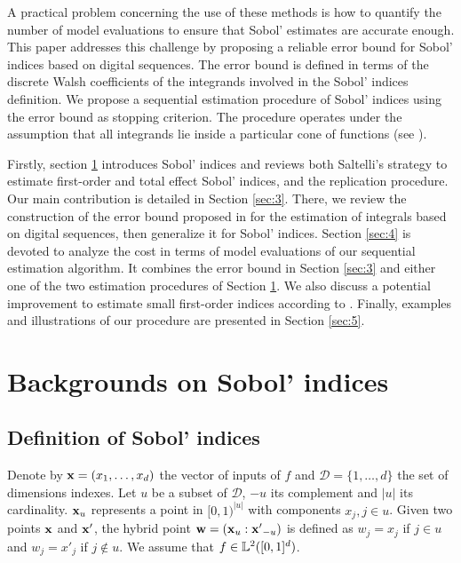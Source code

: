 A practical problem concerning the use of these methods is how to quantify the number of model evaluations to ensure that Sobol' estimates are accurate enough. This paper addresses this challenge by proposing a reliable error bound for Sobol' indices based on digital sequences. The error bound is defined in terms of the discrete Walsh coefficients of the integrands involved in the Sobol' indices definition. We propose a sequential estimation procedure of Sobol' indices using the error bound as stopping criterion. The procedure operates under the assumption that all integrands lie inside a particular cone of functions (see \cite{HicJim}).

Firstly, section \ref{sec:2} introduces Sobol' indices and reviews both Saltelli's strategy to estimate first-order and total effect Sobol' indices, and the replication procedure. Our main contribution is detailed in  Section \ref{sec:3}. There, we review the construction of the error bound proposed in \cite{HicJim} for the estimation of integrals based on digital sequences, then generalize it for Sobol' indices. Section \ref{sec:4} is devoted to analyze the cost in terms of model evaluations of our sequential estimation algorithm. It combines the error bound in Section \ref{sec:3} and either one of the two estimation procedures of Section \ref{sec:2}. We also discuss a potential improvement to estimate small first-order indices according to \cite{Owen}. Finally, examples and illustrations of our procedure are presented in Section \ref{sec:5}. 

\section{Backgrounds on Sobol' indices}
\label{sec:2}

\subsection{Definition of Sobol' indices}
\label{sec:2.1}
Denote by $\boldsymbol{\mathbf{x}}=(x_1,\dots,x_d)$ the vector of inputs of $f$ and $\mathcal{D}=\{1,\dots,d\}$ the set of dimensions indexes. %
Let $u$ be a subset of $\mathcal{D}$, $-u$ its complement and $|u|$ its cardinality. $\boldsymbol{\mathbf{x}}_u$ represents a point in $[0,1)^{|u|}$ with components $x_j, j \in u$. Given two points $\boldsymbol{\mathbf{x}}$ and $\boldsymbol{\mathbf{x}}'$, the hybrid point $\boldsymbol{\mathbf{w}}=(\boldsymbol{\mathbf{x}}_u:{\boldsymbol{\mathbf{x}}'}_{-u})$ is defined as $w_j=x_j$ if $j \in u$ and $w_j={x'}_j$ if $j \notin u$. We assume that $f \in \mathbb{L}^2([0,1]^d)$.%

